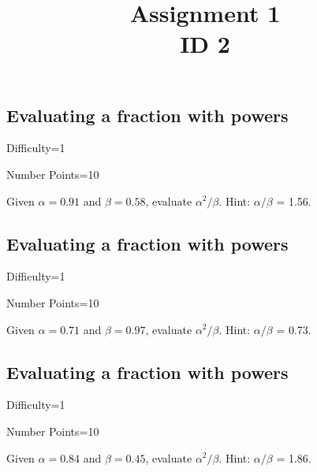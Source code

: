 \documentclass{article}
\title{Assignment 1 \\ ID 2}
\begin{document}
\maketitle

\section{} 



\subsection{Evaluating a fraction with powers}

Difficulty=1

Number Points=10

Given $\alpha = 0.91$ and $\beta = 0.58$, evaluate $\alpha^{2}/\beta$. Hint: $\alpha/\beta$ = 1.56.

\subsection{Evaluating a fraction with powers}

Difficulty=1

Number Points=10

Given $\alpha = 0.71$ and $\beta = 0.97$, evaluate $\alpha^{2}/\beta$. Hint: $\alpha/\beta$ = 0.73.

\subsection{Evaluating a fraction with powers}

Difficulty=1

Number Points=10

Given $\alpha = 0.84$ and $\beta = 0.45$, evaluate $\alpha^{2}/\beta$. Hint: $\alpha/\beta$ = 1.86.
\end{document}
